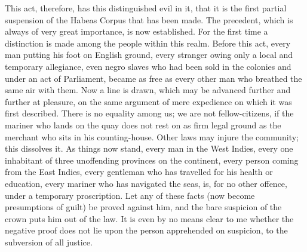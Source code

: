 This act, therefore, has this distinguished evil in it, that it is the first partial suspension of the Habeas Corpus that has been made. The precedent, which is always of very great importance, is now established. For the first time a distinction is made among the people within this realm. Before this act, every man putting his foot on English ground, every stranger owing only a local and temporary allegiance, even negro slaves who had been sold in the colonies and under an act of Parliament, became as free as every other man who breathed the same air with them. Now a line is drawn, which may be advanced further and further at pleasure, on the same argument of mere expedience on which it was first described. There is no equality among us; we are not fellow-citizens, if the mariner who lands on the quay does not rest on as firm legal ground as the merchant who sits in his counting-house. Other laws may injure the community; this dissolves it. As things now stand, every man in the West Indies, every one inhabitant of three unoffending provinces on the continent, every person coming from the East Indies, every gentleman who has travelled for his health or education, every mariner who has navigated the seas, is, for no other offence, under a temporary proscription. Let any of these facts (now become presumptions of guilt) be proved against him, and the bare suspicion of the crown puts him out of the law. It is even by no means clear to me whether the negative proof does not lie upon the person apprehended on suspicion, to the subversion of all justice.

